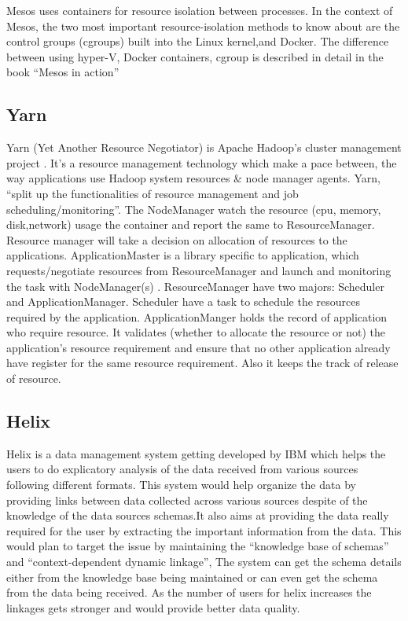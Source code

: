      Mesos uses containers for resource isolation between
     processes. In the context of Mesos, the two most important
     resource-isolation methods to know about are the control groups
     (cgroups) built into the Linux kernel,and Docker. The difference
     between using hyper-V, Docker containers, cgroup is described in
     detail in the book ``Mesos in action'' \cite{book-mesos-Ignazio-2016}


\subsection{ Yarn}

     Yarn (Yet Another Resource Negotiator) is Apache Hadoop’s cluster
     management project \cite{www-cloudera} . It’s a resource
     management technology which make a pace between, the way
     applications use Hadoop system resources \& node manager
     agents. Yarn, ``split up the functionalities of resource
     management and job scheduling/monitoring''. The NodeManager watch
     the resource (cpu, memory, disk,network) usage the container and
     report the same to ResourceManager. Resource manager will take a
     decision on allocation of resources to the
     applications. ApplicationMaster is a library specific to
     application, which requests/negotiate resources from
     ResourceManager and launch and monitoring the task with
     NodeManager(s) \cite{www-architecture}.  ResourceManager have
     two majors: Scheduler and ApplicationManager. Scheduler have a
     task to schedule the resources required by the
     application. ApplicationManger holds the record of application
     who require resource. It validates (whether to allocate the
     resource or not) the application’s resource requirement and
     ensure that no other application already have register for the
     same resource requirement. Also it keeps the track of release of
     resource. \cite{www-HadoopApache}

\subsection{ Helix}

     Helix is a data management system getting developed by IBM which
     helps the users to do explicatory analysis of the data received
     from various sources following different formats. This system
     would help organize the data by providing links between data
     collected across various sources despite of the knowledge of the
     data sources schemas.It also aims at providing  the data really
     required for the user by extracting the important information
     from the data. This would plan to target the issue by
     maintaining the ``knowledge base of schemas'' and
     ``context-dependent dynamic linkage'', The system can get the
     schema details either from the  knowledge base being maintained
     or can even get the schema from the data being received. As the
     number of users for helix increases the linkages gets stronger
     and would provide better data
     quality. \cite{www-ibm-helix-paper}
      
